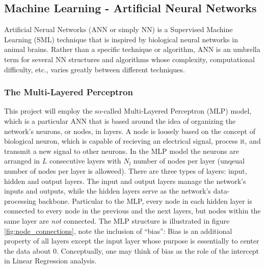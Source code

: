 \documentclass[nofootinbib,reprint,english]{revtex4-1}
\begin{document}
\subsection{Machine Learning - Artificial Neural Networks}
Artificial Nerual Networks (ANN or simply NN) is a Supervised Machine Learning (SML) technique that is inspired by biological neural networks in animal brains. Rather than a specific technique or algorithm, ANN is an umbrella term for several NN structures and algorithms whose complexity, computational difficulty, etc., varies greatly between different techniques.
\subsubsection{The Multi-Layered Perceptron}
This project will employ the so-called Multi-Layered Perceptron (MLP) model, which is a particular ANN that is based around the idea of organizing the network's neurons, or nodes, in layers. A node is loosely based on the concept of biological neuron, which is capable of recieving an electrical signal, process it, and transmit a new signal to other neurons. In the MLP model the neurons are arranged in \(L\) consecutive layers with \(N_l\) number of nodes per layer (unqeual number of nodes per layer is alloweed).  There are three types of layers: input, hidden and output layers. The input and output layers manage the network's inputs and outputs, while the hidden layers serve as the network's data-processing backbone. Particular to the MLP, every node in each hidden layer is connected to every node in the previous and the next layers, but nodes within the same layer are \emph{not} connected. The MLP structure is illustrated in figure \ref{fig:node_connections}, note the inclusion of ``bias'': Bias is an additional property of all layers except the input layer whose purpose is essentially to center the data about 0. Conceptually, one may think of bias as the role of the intercept in Linear Regression analysis.
\end{document}
